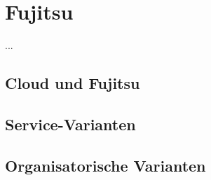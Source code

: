 \section{Fujitsu}
\label{sec_fujitsu}

...

\subsection{Cloud und Fujitsu}
\label{sec_fujitsu_general}



\subsection{Service-Varianten}
\label{sec_fujitsu_delivery}



\subsection{Organisatorische Varianten}
\label{sec_fujitsu_deployment}

